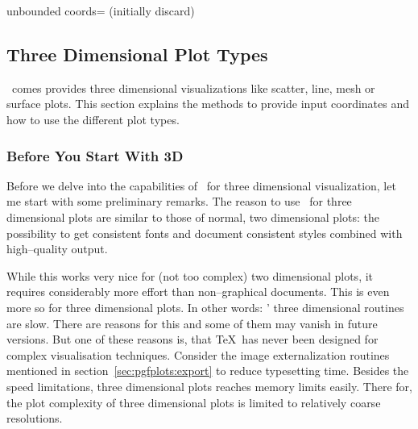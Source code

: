 \begin{pgfplotskey}{unbounded coords= (initially discard)}
\pgfplotsexpensiveexample
\begin{codeexample}[]
\end{codeexample}
\end{pgfplotskey}


\subsection{Three Dimensional Plot Types}
\label{sec:3d}
\PGFPlots\ comes provides three dimensional visualizations like scatter, line, mesh or surface plots. This section explains the methods to provide input coordinates and how to use the different plot types.

\subsubsection{Before You Start With 3D}
\label{pgfplots:3d:preliminary}
Before we delve into the capabilities of \PGFPlots\ for three dimensional visualization, let me start with some preliminary remarks. The reason to use \PGFPlots\ for three dimensional plots are similar to those of normal, two dimensional plots: the possibility to get consistent fonts and document consistent styles combined with high--quality output.

While this works very nice for (not too complex) two dimensional plots, it requires considerably more effort than non--graphical documents. This is even more so for three dimensional plots. In other words: \PGFPlots' three dimensional routines are slow. There are reasons for this and some of them may vanish in future versions. But one of these reasons is, that \TeX\ has never been designed for complex visualisation techniques. Consider the image externalization routines mentioned in section~\ref{sec:pgfplots:export} to reduce typesetting time. Besides the speed limitations, three dimensional plots reaches memory limits easily. There for, the plot complexity of three dimensional plots is limited to relatively coarse resolutions.

